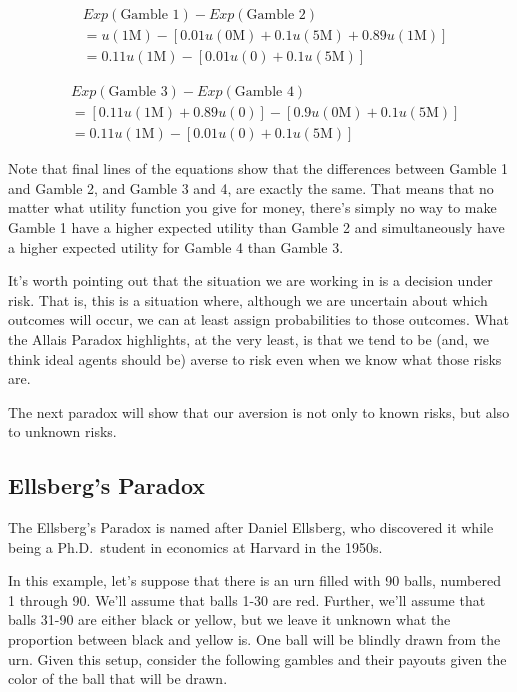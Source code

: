 \documentclass[]{tufte-book}
\begin{document}
\[
\begin{split}
& Exp(\text{Gamble 1}) - Exp(\text{Gamble 2}) \\
&= u(1\text{M}) - [0.01u(0\text{M}) + 0.1u(5\text{M}) + 0.89u(1\text{M})] \\
&= 0.11u(1\text{M}) - [0.01u(0)+0.1u(5\text{M})]
\end{split}
\]

\[
\begin{split}
& Exp(\text{Gamble 3}) - Exp(\text{Gamble 4})  \\
&= [0.11u(1\text{M}) + 0.89u(0)]-[0.9u(0\text{M})+0.1u(5\text{M})]\\
&= 0.11u(1\text{M}) - [0.01u(0)+0.1u(5\text{M})]
\end{split}
\]

Note that final lines of the equations show that the differences between Gamble 1 and Gamble 2, and Gamble 3 and 4, are exactly the same. That means that no matter what utility function you give for money, there's simply no way to make Gamble 1 have a higher expected utility than Gamble 2 and simultaneously have a higher expected utility for Gamble 4 than Gamble 3.

It's worth pointing out that the situation we are working in is a decision under risk. That is, this is a situation where, although we are uncertain about which outcomes will occur, we can at least assign probabilities to those outcomes. What the Allais Paradox highlights, at the very least, is that we tend to be (and, we think ideal agents should be) averse to risk even when we know what those risks are.

The next paradox will show that our aversion is not only to known risks, but also to unknown risks.

\hypertarget{ellsbergs-paradox}{%
\subsection{Ellsberg's Paradox}\label{ellsbergs-paradox}}

The Ellsberg's Paradox is named after Daniel Ellsberg, who discovered it while being a Ph.D.~student in economics at Harvard in the 1950s.

In this example, let's suppose that there is an urn filled with 90 balls, numbered 1 through 90. We'll assume that balls 1-30 are red. Further, we'll assume that balls 31-90 are either black or yellow, but we leave it unknown what the proportion between black and yellow is. One ball will be blindly drawn from the urn. Given this setup, consider the following gambles and their payouts given the color of the ball that will be drawn.
\end{document}

